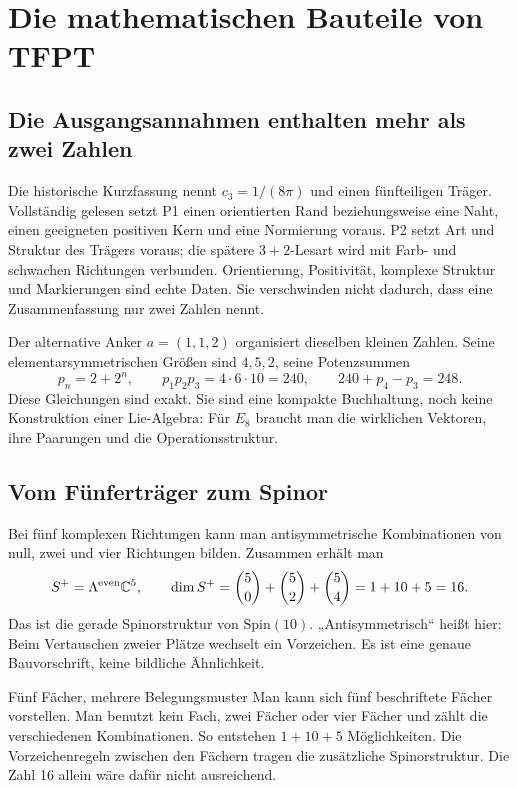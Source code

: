 \chapter{Die mathematischen Bauteile von TFPT}
\label{ch:algebra}
\section{Die Ausgangsannahmen enthalten mehr als zwei Zahlen}
Die historische Kurzfassung nennt $c_3=1/(8\pi)$ und einen fünfteiligen Träger. Vollständig gelesen setzt P1 einen orientierten Rand beziehungsweise eine Naht, einen geeigneten positiven Kern und eine Normierung voraus. P2 setzt Art und Struktur des Trägers voraus; die spätere $3+2$-Lesart wird mit Farb- und schwachen Richtungen verbunden. Orientierung, Positivität, komplexe Struktur und Markierungen sind echte Daten. Sie verschwinden nicht dadurch, dass eine Zusammenfassung nur zwei Zahlen nennt. 

Der alternative Anker $a=(1,1,2)$ organisiert dieselben kleinen Zahlen. Seine elementarsymmetrischen Größen sind $4,5,2$, seine Potenzsummen
\begin{equation}
p_n=2+2^n,\qquad p_1p_2p_3=4\cdot6\cdot10=240,
\qquad240+p_4-p_3=248.
\end{equation}
Diese Gleichungen sind exakt. Sie sind eine kompakte Buchhaltung, noch keine Konstruktion einer Lie-Algebra: Für $E_8$ braucht man die wirklichen Vektoren, ihre Paarungen und die Operationsstruktur.

\section{Vom Fünferträger zum Spinor}
Bei fünf komplexen Richtungen kann man antisymmetrische Kombinationen von null, zwei und vier Richtungen bilden. Zusammen erhält man
\begin{equation}
S^+=\Lambda^{\mathrm{even}}\mathbb C^5,
\qquad\dim S^+=\binom50+\binom52+\binom54=1+10+5=16.
\end{equation}
Das ist die gerade Spinorstruktur von $\mathrm{Spin}(10)$. „Antisymmetrisch“ heißt hier: Beim Vertauschen zweier Plätze wechselt ein Vorzeichen. Es ist eine genaue Bauvorschrift, keine bildliche Ähnlichkeit.

\begin{bild}{Fünf Fächer, mehrere Belegungsmuster}
Man kann sich fünf beschriftete Fächer vorstellen. Man benutzt kein Fach, zwei Fächer oder vier Fächer und zählt die verschiedenen Kombinationen. So entstehen $1+10+5$ Möglichkeiten. Die Vorzeichenregeln zwischen den Fächern tragen die zusätzliche Spinorstruktur. Die Zahl 16 allein wäre dafür nicht ausreichend.
\end{bild}

